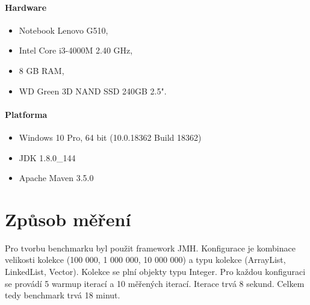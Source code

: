\documentclass[12pt, a4paper]{article}
\begin{document}
	\paragraph{Hardware}
	\begin{itemize}
		\item Notebook Lenovo G510,
		\item Intel Core i3-4000M 2.40 GHz,
		\item 8 GB RAM,
		\item WD Green 3D NAND SSD 240GB 2.5".
	\end{itemize}
	
	\paragraph{Platforma}
	\begin{itemize}
		\item Windows 10 Pro, 64 bit (10.0.18362 Build 18362)
		\item JDK 1.8.0\_144
		\item Apache Maven 3.5.0
	\end{itemize}
	
	\section*{Způsob měření}
	Pro tvorbu benchmarku byl použit framework JMH.
	Konfigurace je kombinace velikosti kolekce (100 000, 1 000 000, 10 000 000) a typu kolekce (ArrayList, LinkedList, Vector).
	Kolekce se plní objekty typu Integer.
	Pro každou konfiguraci se provádí 5 warmup iterací a 10 měřených iterací. Iterace trvá 8 sekund. Celkem tedy benchmark trvá 18 minut.
	
\end{document}
